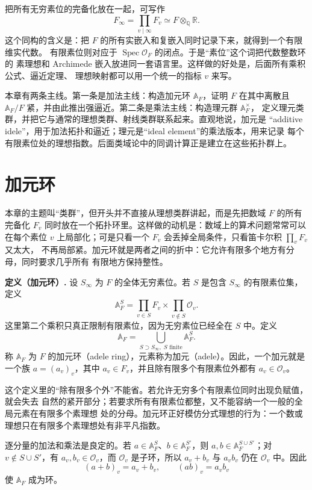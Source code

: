 \documentclass[11pt,a4paper,openany]{ctexbook}
\numberwithin{equation}{chapter}
\newcommand{\Q}{\mathbb{Q}}
\newcommand{\R}{\mathbb{R}}
\newcommand{\A}{\mathbb{A}}
\theoremstyle{plain}
\theoremstyle{definition}
\theoremstyle{remark}
\begin{document}
把所有无穷素位的完备化放在一起，可写作
\[
F_\infty=\prod_{v\mid\infty}F_v\simeq F\otimes_\Q\R.
\]
这个同构的含义是：把 $F$ 的所有实嵌入和复嵌入同时记录下来，就得到一个有限维实代数。
有限素位则对应于 $\operatorname{Spec}\mathcal O_F$ 的闭点。于是“素位”这个词把代数整数环的
素理想和 Archimede 嵌入放进同一套语言里。这样做的好处是，后面所有乘积公式、逼近定理、
理想映射都可以用一个统一的指标 $v$ 来写。

本章有两条主线。第一条是加法主线：构造加元环 $\A_F$，证明 $F$ 在其中离散且
$\A_F/F$ 紧，并由此推出强逼近。第二条是乘法主线：构造理元群 $\A_F^\times$，
定义理元类群，并把它与通常的理想类群、射线类群联系起来。直观地说，加元是
“additive idele”，用于加法拓扑和逼近；理元是“ideal element”的乘法版本，用来记录
每个有限素位处的理想指数。后面类域论中的同调计算正是建立在这些拓扑群上。

\section{加元环}

本章的主题叫“类群”，但开头并不直接从理想类群讲起，而是先把数域 $F$ 的所有完备化
$F_v$ 同时放在一个拓扑环里。这样做的动机是：数域上的算术问题常常可以在每个素位
$v$ 上局部化；可是只看一个 $F_v$ 会丢掉全局条件，只看笛卡尔积 $\prod_vF_v$ 又太大，
不再局部紧。加元环就是两者之间的折中：它允许有限多个地方有分母，同时要求几乎所有
有限地方保持整性。

\textbf{定义（加元环）.}
设 $S_\infty$ 为 $F$ 的全体无穷素位。若 $S$ 是包含 $S_\infty$ 的有限素位集，定义
\[
 \A_F^S=\prod_{v\in S}F_v\times\prod_{v\notin S}\mathcal O_v.
\]
这里第二个乘积只真正限制有限素位，因为无穷素位已经全在 $S$ 中。定义
\[
 \A_F=\bigcup_{S\supset S_\infty,\;S\text{ finite}}\A_F^S.
\]
称 $\A_F$ 为 $F$ 的加元环（adele ring），元素称为加元（adele）。因此，一个加元就是
一个族 $a=(a_v)_v$，其中 $a_v\in F_v$，并且除有限多个有限素位外都有
$a_v\in\mathcal O_v$。

这个定义里的“除有限多个外”不能省。若允许无穷多个有限素位同时出现负赋值，就会失去
自然的紧开部分；若要求所有有限素位都整，又不能容纳一个一般的全局元素在有限多个素理想
处的分母。加元环正好模仿分式理想的行为：一个数或理想只在有限多个素理想处有非平凡指数。

逐分量的加法和乘法是良定的。若 $a\in\A_F^S$、$b\in\A_F^{S'}$，则
$a,b\in\A_F^{S\cup S'}$；对 $v\notin S\cup S'$，有 $a_v,b_v\in\mathcal O_v$，而
$\mathcal O_v$ 是子环，所以 $a_v+b_v$ 与 $a_vb_v$ 仍在 $\mathcal O_v$ 中。因此
\[
 (a+b)_v=a_v+b_v,\qquad (ab)_v=a_vb_v
\]
使 $\A_F$ 成为环。
\end{document}
